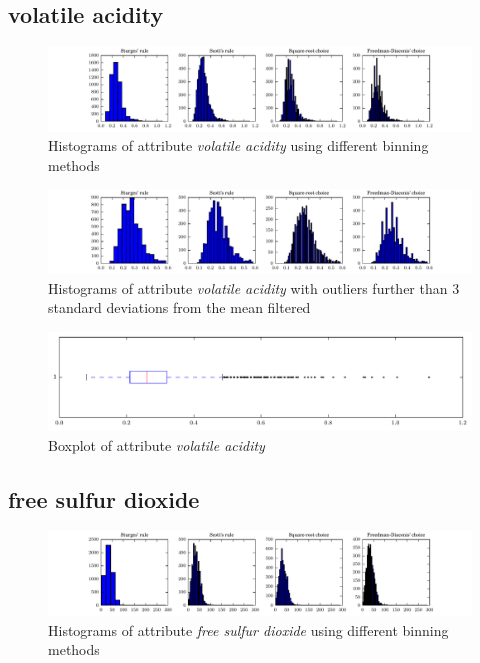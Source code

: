\documentclass{report}
\begin{document}
\newpage\subsection{volatile acidity}
\begin{figure}[H]
\includegraphics[width=\textwidth]{histograms/volatile_acidity.pdf}
\caption{Histograms of attribute \emph{volatile acidity} using different binning methods}\end{figure}

\begin{figure}[H]
\includegraphics[width=\textwidth]{histograms/volatile_acidity_filtered.pdf}
\caption{Histograms of attribute \emph{volatile acidity} with outliers further than 3 standard deviations from the mean filtered}\n\end{figure}

\begin{figure}[H]
\includegraphics[width=\textwidth]{boxplots/volatile_acidity.pdf}
\caption{Boxplot of attribute \emph{volatile acidity}}\end{figure}

\newpage\subsection{free sulfur dioxide}
\begin{figure}[H]
\includegraphics[width=\textwidth]{histograms/free_sulfur_dioxide.pdf}
\caption{Histograms of attribute \emph{free sulfur dioxide} using different binning methods}\end{figure}
\end{document}
